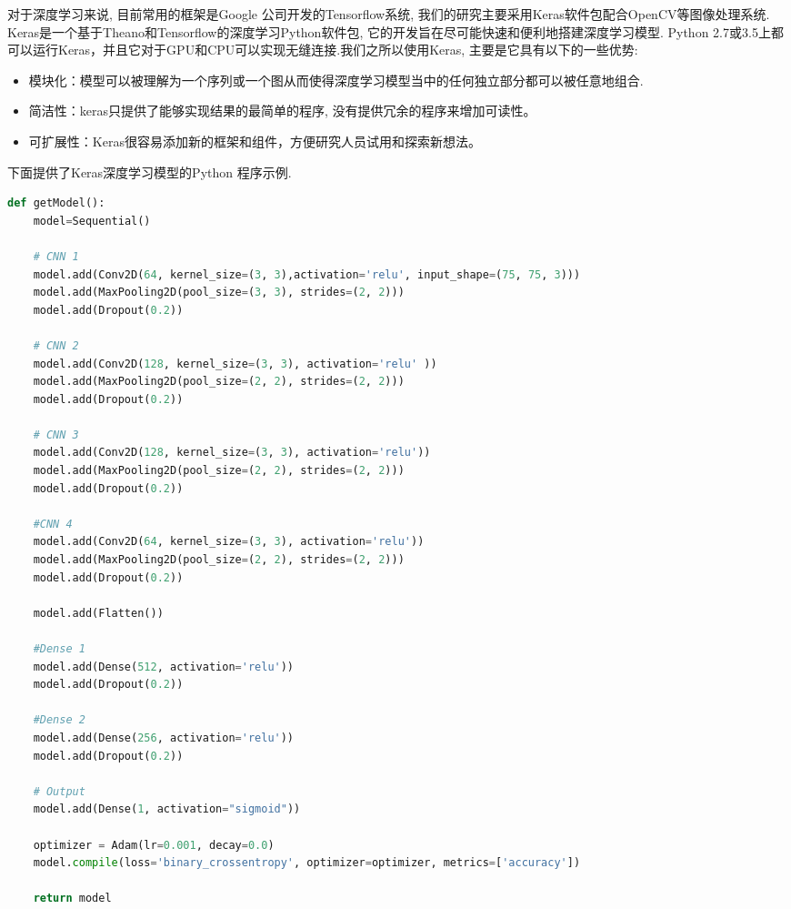 \documentclass[12pt]{article}
\begin{document}
\begin{CJK*}{UTF8}{gbsn}
对于深度学习来说, 目前常用的框架是Google 公司开发的Tensorflow系统, 我们的研究主要采用Keras软件包配合OpenCV等图像处理系统. Keras是一个基于Theano和Tensorflow的深度学习Python软件包, 它的开发旨在尽可能快速和便利地搭建深度学习模型. Python 2.7或3.5上都可以运行Keras，并且它对于GPU和CPU可以实现无缝连接.我们之所以使用Keras, 主要是它具有以下的一些优势:
\begin{itemize}
    \item 模块化：模型可以被理解为一个序列或一个图从而使得深度学习模型当中的任何独立部分都可以被任意地组合.
\item 简洁性：keras只提供了能够实现结果的最简单的程序, 没有提供冗余的程序来增加可读性。
\item 可扩展性：Keras很容易添加新的框架和组件，方便研究人员试用和探索新想法。
\end{itemize}
下面提供了Keras深度学习模型的Python 程序示例.

\begin{lstlisting}[language=Python, caption=Keras example]
def getModel():
    model=Sequential()
    
    # CNN 1
    model.add(Conv2D(64, kernel_size=(3, 3),activation='relu', input_shape=(75, 75, 3)))
    model.add(MaxPooling2D(pool_size=(3, 3), strides=(2, 2)))
    model.add(Dropout(0.2))

    # CNN 2
    model.add(Conv2D(128, kernel_size=(3, 3), activation='relu' ))
    model.add(MaxPooling2D(pool_size=(2, 2), strides=(2, 2)))
    model.add(Dropout(0.2))

    # CNN 3
    model.add(Conv2D(128, kernel_size=(3, 3), activation='relu'))
    model.add(MaxPooling2D(pool_size=(2, 2), strides=(2, 2)))
    model.add(Dropout(0.2))

    #CNN 4
    model.add(Conv2D(64, kernel_size=(3, 3), activation='relu'))
    model.add(MaxPooling2D(pool_size=(2, 2), strides=(2, 2)))
    model.add(Dropout(0.2))

    model.add(Flatten())

    #Dense 1
    model.add(Dense(512, activation='relu'))
    model.add(Dropout(0.2))

    #Dense 2
    model.add(Dense(256, activation='relu'))
    model.add(Dropout(0.2))

    # Output 
    model.add(Dense(1, activation="sigmoid"))

    optimizer = Adam(lr=0.001, decay=0.0)
    model.compile(loss='binary_crossentropy', optimizer=optimizer, metrics=['accuracy'])
    
    return model
\end{lstlisting}

\end{CJK*}
\end{document}
